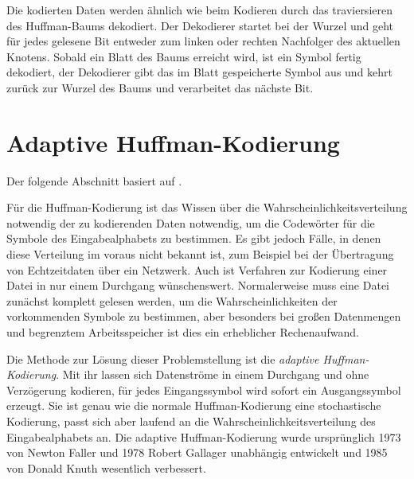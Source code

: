 \documentclass[twoside,11pt,a4paper]{article}
\theoremstyle{break}
\begin{document}
Die kodierten Daten werden ähnlich wie beim Kodieren durch das
traviersieren des Huffman-Baums dekodiert. Der Dekodierer startet bei
der Wurzel und geht für jedes gelesene Bit entweder zum linken oder
rechten Nachfolger des aktuellen Knotens. Sobald ein Blatt des Baums
erreicht wird, ist ein Symbol fertig dekodiert, der Dekodierer gibt
das im Blatt gespeicherte Symbol aus und kehrt zurück zur Wurzel des
Baums und verarbeitet das nächste Bit.



\section{Adaptive Huffman-Kodierung}
Der folgende Abschnitt basiert auf \cite{Salomon:2010}.

Für die Huffman-Kodierung ist das Wissen über die
Wahrscheinlichkeitsverteilung notwendig der zu kodierenden Daten
notwendig, um die Codewörter für die Symbole des Eingabealphabets zu
bestimmen. Es gibt jedoch Fälle, in denen diese Verteilung im voraus
nicht bekannt ist, zum Beispiel bei der Übertragung von Echtzeitdaten
über ein Netzwerk. Auch ist Verfahren zur Kodierung einer Datei in nur
einem Durchgang wünschenswert. Normalerweise muss eine Datei zunächst
komplett gelesen werden, um die Wahrscheinlichkeiten der vorkommenden
Symbole zu bestimmen, aber besonders bei großen Datenmengen und
begrenztem Arbeitsspeicher ist dies ein erheblicher Rechenaufwand.

Die Methode zur Lösung dieser Problemstellung ist die \emph{adaptive
  Huffman-Kodierung}. Mit ihr lassen sich Datenströme in einem
Durchgang und ohne Verzögerung kodieren, für jedes Eingangssymbol wird
sofort ein Ausgangssymbol erzeugt. Sie ist genau wie die normale
Huffman-Kodierung eine stochastische Kodierung, passt sich aber
laufend an die Wahrscheinlichkeitsverteilung des Eingabealphabets an.
Die adaptive Huffman-Kodierung wurde ursprünglich 1973 von Newton
Faller und 1978 Robert Gallager unabhängig entwickelt und 1985 von
Donald Knuth wesentlich verbessert.
\end{document}
